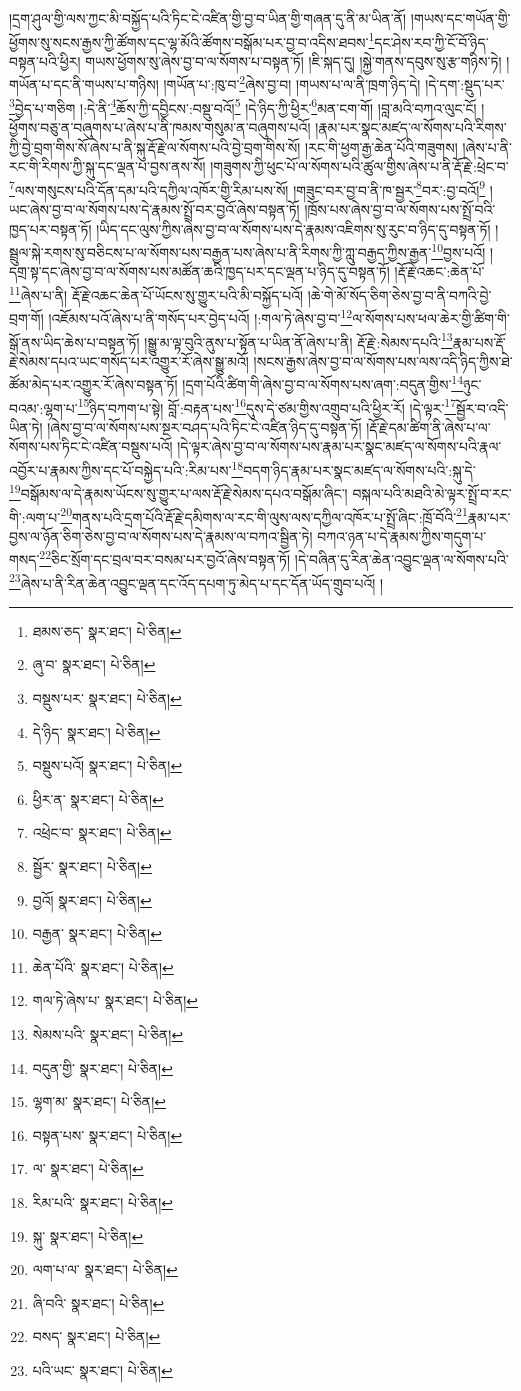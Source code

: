 །དྲག་ཤུལ་གྱི་ལས་ཀྱང་མི་བསྐྱོད་པའི་ཏིང་ངེ་འཛིན་གྱི་བྱ་བ་ཡིན་གྱི་གཞན་དུ་ནི་མ་ཡིན་ནོ། །གཡས་དང་གཡོན་གྱི་ཕྱོགས་སུ་སངས་རྒྱས་ཀྱི་ཚོགས་དང་ལྷ་མོའི་ཚོགས་བསྒོམ་པར་བྱ་བ་འདིས་ཐབས་\footnote{ཐམས་ཅད་  སྣར་ཐང་།  པེ་ཅིན། }དང་ཤེས་རབ་ཀྱི་ངོ་བོ་ཉིད་བསྟན་པའི་ཕྱིར། གཡས་ཕྱོགས་སུ་ཞེས་བྱ་བ་ལ་སོགས་པ་བསྟན་ཏོ། །ཇི་སྐད་དུ། །སྐྱེ་གནས་དབུས་སུ་རྩ་གཉིས་ཏེ། །གཡོན་པ་དང་ནི་གཡས་པ་གཉིས། །གཡོན་པ་:ཁུ་བ་\footnote{ཞུ་བ་  སྣར་ཐང་།  པེ་ཅིན། }ཞེས་བྱ་བ། །གཡས་པ་ལ་ནི་ཁྲག་ཉིད་དེ། །དེ་དག་:སྡུད་པར་\footnote{བསྡུས་པར་  སྣར་ཐང་།  པེ་ཅིན། }བྱེད་པ་གཅིག །:དེ་ནི་\footnote{དེ་ཉིད་  སྣར་ཐང་།  པེ་ཅིན། }ཆོས་ཀྱི་དབྱིངས་:བསྡུ་བའོ།\footnote{བསྡུས་པའོ།  སྣར་ཐང་།  པེ་ཅིན། } །དེ་ཉིད་ཀྱི་ཕྱིར་\footnote{ཕྱིར་ན་  སྣར་ཐང་།  པེ་ཅིན། }མན་ངག་གོ། །བླ་མའི་བཀའ་ལུང་ངོ། །ཕྱོགས་བཅུ་ན་བཞུགས་པ་ཞེས་པ་ནི་ཁམས་གསུམ་ན་བཞུགས་པའོ། །རྣམ་པར་སྣང་མཛད་ལ་སོགས་པའི་རིགས་ཀྱི་བྱེ་བྲག་གིས་སོ་ཞེས་པ་ནི་སྐུ་རྡོ་རྗེ་ལ་སོགས་པའི་བྱེ་བྲག་གིས་སོ། །རང་གི་ཕྱག་རྒྱ་ཆེན་པོའི་གཟུགས། །ཞེས་པ་ནི་རང་གི་རིགས་ཀྱི་སྐུ་དང་ལྡན་པ་བྱས་ནས་སོ། །གཟུགས་ཀྱི་ཕུང་པོ་ལ་སོགས་པའི་ཚུལ་གྱིས་ཞེས་པ་ནི་རྡོ་རྗེ་:ཕྲེང་བ་\footnote{འཕྲེང་བ་  སྣར་ཐང་།  པེ་ཅིན། }ལས་གསུངས་པའི་དོན་དམ་པའི་དཀྱིལ་འཁོར་གྱི་རིམ་པས་སོ། །གཟུང་བར་བྱ་བ་ནི་ཁ་སྦྱར་\footnote{སྦྱོར་  སྣར་ཐང་།  པེ་ཅིན། }བར་:བྱ་བའོ།\footnote{བྱའོ།  སྣར་ཐང་།  པེ་ཅིན། } །ཡང་ཞེས་བྱ་བ་ལ་སོགས་པས་དེ་རྣམས་སྤྲོ་བར་བྱའོ་ཞེས་བསྟན་ཏོ། །ཁྲོས་པས་ཞེས་བྱ་བ་ལ་སོགས་པས་སྤྲོ་བའི་ཁྱད་པར་བསྟན་ཏོ། །ཡིད་དང་ལུས་ཀྱིས་ཞེས་བྱ་བ་ལ་སོགས་པས་དེ་རྣམས་འཇིགས་སུ་རུང་བ་ཉིད་དུ་བསྟན་ཏོ། །སྦྲུལ་སྐེ་རགས་སུ་བཅིངས་པ་ལ་སོགས་པས་བརྒྱན་པས་ཞེས་པ་ནི་རིགས་ཀྱི་ཀླུ་བརྒྱད་ཀྱིས་རྒྱན་\footnote{བརྒྱན་  སྣར་ཐང་།  པེ་ཅིན། }བྱས་པའོ། །དགྲ་སྟ་དང་ཞེས་བྱ་བ་ལ་སོགས་པས་མཚོན་ཆའི་ཁྱད་པར་དང་ལྡན་པ་ཉིད་དུ་བསྟན་ཏོ། །རྡོ་རྗེ་འཆང་:ཆེན་པོ་\footnote{ཆེན་པོའི་  སྣར་ཐང་།  པེ་ཅིན། }ཞེས་པ་ནི། རྡོ་རྗེ་འཆང་ཆེན་པོ་ཡོངས་སུ་གྱུར་པའི་མི་བསྐྱོད་པའོ། །ཆེ་གེ་མོ་སོད་ཅིག་ཅེས་བྱ་བ་ནི་བཀའི་བྱེ་བྲག་གོ། །འཇོམས་པའོ་ཞེས་པ་ནི་གསོད་པར་བྱེད་པའོ། །:གལ་ཏེ་ཞེས་བྱ་བ་\footnote{གལ་ཏེ་ཞེས་པ་  སྣར་ཐང་།  པེ་ཅིན། }ལ་སོགས་པས་ཕལ་ཆེར་གྱི་ཚིག་གི་སྒོ་ནས་ཡིད་ཆེས་པ་བསྟན་ཏོ། །སྒྱུ་མ་ལྟ་བུའི་ནུས་པ་སྟོན་པ་ཡིན་ནོ་ཞེས་པ་ནི། རྡོ་རྗེ་:སེམས་དཔའི་\footnote{སེམས་པའི་  སྣར་ཐང་།  པེ་ཅིན། }རྣམ་པས་རྡོ་རྗེ་སེམས་དཔའ་ཡང་གསོད་པར་འགྱུར་རོ་ཞེས་སྒྱུ་མའོ། །སངས་རྒྱས་ཞེས་བྱ་བ་ལ་སོགས་པས་ལས་འདི་ཉིད་ཀྱིས་ཐེ་ཚོམ་མེད་པར་འགྱུར་རོ་ཞེས་བསྟན་ཏོ། །དྲག་པོའི་ཚིག་གི་ཞེས་བྱ་བ་ལ་སོགས་པས་ཞག་:བདུན་གྱིས་\footnote{བདུན་གྱི་  སྣར་ཐང་།  པེ་ཅིན། }ཉུང་བའམ་:ལྷག་པ་\footnote{ལྷག་མ་  སྣར་ཐང་།  པེ་ཅིན། }ཉིད་བཀག་པ་སྟེ། བློ་:བརྟན་པས་\footnote{བསྟན་པས་  སྣར་ཐང་།  པེ་ཅིན། }དུས་དེ་ཙམ་གྱིས་འགྲུབ་པའི་ཕྱིར་རོ། །དེ་ལྟར་\footnote{ལ་  སྣར་ཐང་།  པེ་ཅིན། }སྦྱོར་བ་འདི་ཡིན་ཏེ། །ཞེས་བྱ་བ་ལ་སོགས་པས་སྔར་བཤད་པའི་ཏིང་ངེ་འཛིན་ཉིད་དུ་བསྟན་ཏོ། །རྡོ་རྗེ་དམ་ཚིག་ནི་ཞེས་པ་ལ་སོགས་པས་ཏིང་ངེ་འཛིན་བསྡུས་པའོ། །དེ་ལྟར་ཞེས་བྱ་བ་ལ་སོགས་པས་རྣམ་པར་སྣང་མཛད་ལ་སོགས་པའི་རྣལ་འབྱོར་པ་རྣམས་ཀྱིས་དང་པོ་བསྐྱེད་པའི་:རིམ་པས་\footnote{རིམ་པའི་  སྣར་ཐང་།  པེ་ཅིན། }བདག་ཉིད་རྣམ་པར་སྣང་མཛད་ལ་སོགས་པའི་:སྐུ་དེ་\footnote{སྐུ་  སྣར་ཐང་།  པེ་ཅིན། }བསྒོམས་ལ་དེ་རྣམས་ཡོངས་སུ་གྱུར་པ་ལས་རྡོ་རྗེ་སེམས་དཔའ་བསྒོམ་ཞིང་། བསྐལ་པའི་མཐའི་མེ་ལྟར་སྤྲོ་བ་རང་གི་:ལག་པ་\footnote{ལག་པ་ལ་  སྣར་ཐང་།  པེ་ཅིན། }གནས་པའི་དྲག་པོའི་རྡོ་རྗེ་དམིགས་ལ་རང་གི་ལུས་ལས་དཀྱིལ་འཁོར་པ་སྤྲོ་ཞིང་:ཁྲོ་བོའི་\footnote{ཞི་བའི་  སྣར་ཐང་།  པེ་ཅིན། }རྣམ་པར་བྱས་ལ་ཉོན་ཅིག་ཅེས་བྱ་བ་ལ་སོགས་པས་དེ་རྣམས་ལ་བཀའ་སྦྱིན་ཏེ། བཀའ་ཉན་པ་དེ་རྣམས་ཀྱིས་གདུག་པ་གསད་\footnote{བསད་  སྣར་ཐང་།  པེ་ཅིན། }ཅིང་སྲོག་དང་བྲལ་བར་བསམ་པར་བྱའོ་ཞེས་བསྟན་ཏོ། །དེ་བཞིན་དུ་རིན་ཆེན་འབྱུང་ལྡན་ལ་སོགས་པའི་\footnote{པའི་ཡང་  སྣར་ཐང་།  པེ་ཅིན། }ཞེས་པ་ནི་རིན་ཆེན་འབྱུང་ལྡན་དང་འོད་དཔག་ཏུ་མེད་པ་དང་དོན་ཡོད་གྲུབ་པའོ། །
